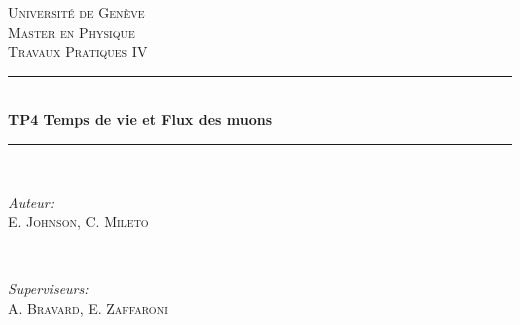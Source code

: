\documentclass[12pt]{article}
\begin{document}

\begin{titlepage}

\newcommand{\HRule}{\rule{\linewidth}{0.5mm}} %

\center %
 

\textsc{\LARGE Université de Genève}\\[1.5cm] %
\textsc{\Large Master en Physique}\\[0.5cm] %
\textsc{\large Travaux Pratiques IV}\\[0.5cm] %


\HRule \\[0.4cm]
{ \huge \bfseries TP4 Temps de vie et Flux des muons}\\[0.4cm] %
\HRule \\[1.5cm]
 

\begin{minipage}{0.4\textwidth}
\begin{flushleft} \large
\emph{Auteur:}\\
E. \textsc{Johnson}, C. \textsc{Mileto} %
\end{flushleft}
\end{minipage}
~
\begin{minipage}{0.4\textwidth}
\begin{flushright} \large
\emph{Superviseurs:} \\
A. \textsc{Bravard}, E. \textsc{Zaffaroni}
\end{flushright}
\end{minipage}\\[2cm]


\end{titlepage}
\end{document}
